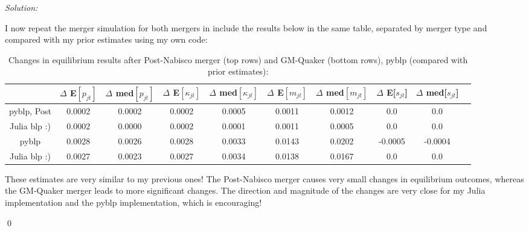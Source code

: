 \documentclass[12pt]{article}
\newenvironment{sol}
    {\emph{Solution:}
    }
    {
    \qed
    }
\begin{document}
\begin{sol}
I now repeat the merger simulation for both mergers in include the results below in the same table, separated by merger type and compared with my prior estimates using my own code:
\begin{center}
    \begin{table}[htbp]
        \centering
        \small
        \caption{Changes in equilibrium results after Post-Nabisco merger (top rows) and GM-Quaker (bottom rows), pyblp (compared with prior estimates):}
          \begin{tabular}{cccccccccc}
              \toprule
                 &$\Delta$ E$[p_{jt}]$ & $\Delta$ med$[p_{jt}]$ &$\Delta$  E$[\kappa_{jt}]$ & $\Delta$  med$[\kappa_{jt}]$ & $\Delta$ E$[m_{jt}]$ &  $\Delta$ med$[m_{jt}]$ & $\Delta$ E[$s_{jt}$] & $\Delta$ med[$s_{jt}$]  \\
              \midrule
                 pyblp, Post&  0.0002 & 0.0002 & 0.0002& 0.0005&0.0011&0.0012&    0.0 &0.0 \\
                 Julia blp :)&  0.0002 & 0.0000 & 0.0002& 0.0001&0.0011&0.0005&    0.0 &0.0  \\
                 \midrule
                 pyblp&  0.0028 & 0.0026 & 0.0028& 0.0033&0.0143&0.0202&  -0.0005 &-0.0004 \\
                 Julia blp :)&  0.0027 & 0.0023 & 0.0027& 0.0034&0.0138&0.0167&    0.0 &0.0  \\
              \bottomrule
          \end{tabular}
        \label{tab:merger_pyblp}
      \end{table}
\end{center}
These estimates are very similar to my previous ones! The Post-Nabisco merger causes very small changes in equilibrium outcomes, whereas the GM-Quaker merger leads to more significant changes. The direction and magnitude of the changes are very close for my Julia implementation and the pyblp implementation, which is encouraging!
\end{sol}


    
\end{document}
